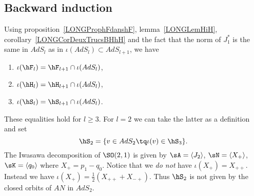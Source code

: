 %
\subsection{Backward induction}
%

Using proposition~\ref{LONGProphFdanshF}, lemma~\ref{LONGLemHiH}, corollary~\ref{LONGCorDeuxTrucsBHhH} and the fact that the norm of $J_1^*$ is the same in $AdS_l$ as in $\iota(AdS_l)\subset AdS_{l+1}$, we have
\begin{enumerate}
	\item
	      $\iota(\hF_l)=\hF_{l+1}\cap\iota(AdS_l)$,
	\item
	      $\iota(\hH_l)=\hH_{l+1}\cap\iota(AdS_l)$,
	\item
	      $\iota(\hS_l)=\hS_{l+1}\cap\iota(AdS_l)$.
\end{enumerate}
These equalities hold for $l\geq 3$. For $l=2$ we can take the latter as a definition and set
\begin{equation}
	\hS_2=\{ v\in AdS_2\tq \iota(v)\in\hS_3 \}.
\end{equation}
The Iwasawa decomposition of $\SO(2,1)$ is given by $\sA=\langle J_2\rangle$, $\sN=\langle X_+\rangle$, $\sK=\langle q_0\rangle$ where $X_+=p_1-q_0$. Notice that we \emph{do not} have $\iota(X_+)=X_{++}$. Instead we have $\iota(X_+)=\frac{ 1 }{2}(X_{++}+X_{-+})$. Thus $\hS_2$ is not given by the closed orbits of $AN$ in $AdS_2$.

